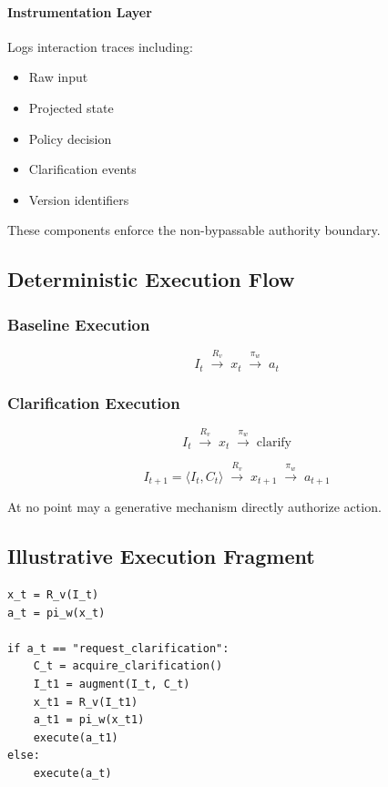 \documentclass[11pt]{article}
\begin{document}
\paragraph{Instrumentation Layer}
Logs interaction traces including:

\begin{itemize}
  \item Raw input
  \item Projected state
  \item Policy decision
  \item Clarification events
  \item Version identifiers
\end{itemize}

These components enforce the non-bypassable authority boundary.


\subsection{Deterministic Execution Flow}

\subsubsection*{Baseline Execution}

\[
I_t 
\;\xrightarrow{R_v}\;
x_t
\;\xrightarrow{\pi_w}\;
a_t
\]

\subsubsection*{Clarification Execution}

\[
I_t
\;\xrightarrow{R_v}\;
x_t
\;\xrightarrow{\pi_w}\;
\text{clarify}
\]

\[
I_{t+1} = \langle I_t, C_t \rangle
\;\xrightarrow{R_v}\;
x_{t+1}
\;\xrightarrow{\pi_w}\;
a_{t+1}
\]

At no point may a generative mechanism directly authorize action.


\subsection{Illustrative Execution Fragment}

\begin{verbatim}
x_t = R_v(I_t)
a_t = pi_w(x_t)

if a_t == "request_clarification":
    C_t = acquire_clarification()
    I_t1 = augment(I_t, C_t)
    x_t1 = R_v(I_t1)
    a_t1 = pi_w(x_t1)
    execute(a_t1)
else:
    execute(a_t)
\end{verbatim}
\end{document}
